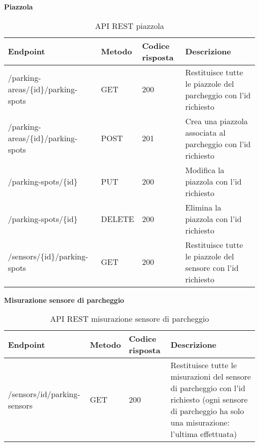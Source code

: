 \leavevmode\newline
\textbf{Piazzola}
\\
\begin{table}[H]
    \begin{tabular}{|p{3.2cm}|p{1.4cm}|p{1.4cm}|p{5.8cm}|} 
    \hline
    \textbf{Endpoint} & \textbf{Metodo} & \textbf{Codice risposta} & \textbf{Descrizione} \\ 
    \hline
    /parking-areas/\{id\}/parking-spots & GET & 200 & Restituisce tutte le piazzole del parcheggio con l'id 
    richiesto \\ 
    \hline
    /parking-areas/\{id\}/parking-spots & POST & 201 & Crea una piazzola associata al parcheggio con l'id 
    richiesto \\ 
    \hline
    /parking-spots/\{id\} & PUT & 200 & Modifica la piazzola con l'id richiesto \\ 
    \hline
    /parking-spots/\{id\} & DELETE & 200 & Elimina la piazzola con l'id richiesto \\ 
    \hline
    /sensors/\{id\}/parking-spots & GET & 200 & Restituisce tutte le piazzole del sensore con l'id 
    richiesto \\ 
    \hline
    \end{tabular}
    \caption{API REST piazzola}
\end{table}
\clearpage
\leavevmode\newline
\textbf{Misurazione sensore di parcheggio}
\\
\begin{table}[H]
    \begin{tabular}{|p{3.2cm}|p{1.4cm}|p{1.4cm}|p{5.8cm}|} 
    \hline
    \textbf{Endpoint} & \textbf{Metodo} & \textbf{Codice risposta} & \textbf{Descrizione} \\ 
    \hline
    /sensors/{id}/parking-sensors & GET & 200 & Restituisce tutte le misurazioni del sensore di parcheggio con l'id 
    richiesto (ogni sensore di parcheggio ha solo una misurazione: l'ultima effettuata) \\ 
    \hline
    \end{tabular}
    \caption{API REST misurazione sensore di parcheggio}
\end{table}